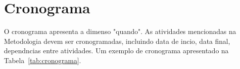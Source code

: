 \documentclass[a4paper,titlepage,12pt]{article}
\begin{document}

\newpage


\section{Cronograma}
\label{sec:cronograma}

O cronograma apresenta a dimenso "quando". As atividades mencionadas na Metodologia devem ser cronogramadas, incluindo data de incio, data final, dependncias entre atividades.
Um exemplo de cronograma  apresentado na Tabela~\ref{tab:cronograma}.
\end{document}
